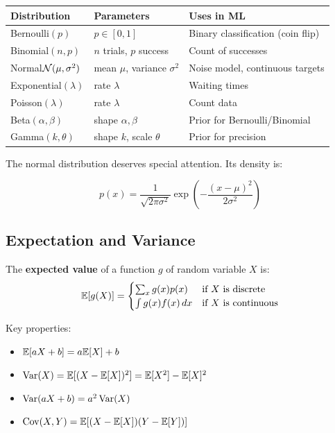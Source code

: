 \begin{longtable}{p{3cm}p{4cm}p{5cm}}
	\toprule
	\textbf{Distribution}     & \textbf{Parameters}             & \textbf{Uses in ML}               \\
	\midrule
	Bernoulli$(p)$            & $p \in [0,1]$                   & Binary classification (coin flip) \\
	Binomial$(n, p)$          & $n$ trials, $p$ success         & Count of successes                \\
	Normal$\mathcal{N}(\mu, \sigma^2)$ & mean $\mu$, variance $\sigma^2$ & Noise model, continuous targets   \\
	Exponential$(\lambda)$    & rate $\lambda$                  & Waiting times                     \\
	Poisson$(\lambda)$        & rate $\lambda$                  & Count data                        \\
	Beta$(\alpha, \beta)$     & shape $\alpha, \beta$           & Prior for Bernoulli/Binomial      \\
	Gamma$(k, \theta)$        & shape $k$, scale $\theta$       & Prior for precision               \\
	\bottomrule
\end{longtable}

The normal distribution deserves special attention. Its density is:

\[
	p(x) = \frac{1}{\sqrt{2\pi\sigma^2}} \exp\left(-\frac{(x - \mu)^2}{2\sigma^2}\right)
\]

\subsection{Expectation and Variance}

\begin{definition}[Expectation]
	The \textbf{expected value} of a function $g$ of random variable $X$ is:
	\[
		\mathbb{E}[g(X)] = \begin{cases}
			\sum_x g(x) p(x)     & \text{if } X \text{ is discrete}   \\
			\int g(x) f(x) \, dx & \text{if } X \text{ is continuous}
		\end{cases}
	\]
\end{definition}

Key properties:
\begin{itemize}
	\item $\mathbb{E}[aX + b] = a\mathbb{E}[X] + b$
	\item $\operatorname{Var}(X) = \mathbb{E}[(X - \mathbb{E}[X])^2] = \mathbb{E}[X^2] - \mathbb{E}[X]^2$
	\item $\operatorname{Var}(aX + b) = a^2 \operatorname{Var}(X)$
	\item $\operatorname{Cov}(X, Y) = \mathbb{E}[(X - \mathbb{E}[X])(Y - \mathbb{E}[Y])]$
\end{itemize}

